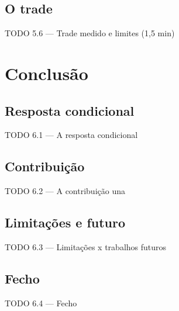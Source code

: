 \documentclass{beamer}
\begin{document}
\subsection{O trade}
\begin{frame}{TODO 5.6 --- Trade medido e limites (1,5 min)}
\end{frame}


\section{Conclusão}

\subsection{Resposta condicional}
\begin{frame}{TODO 6.1 --- A resposta condicional}
\end{frame}

\subsection{Contribuição}
\begin{frame}{TODO 6.2 --- A contribuição una}
\end{frame}

\subsection{Limitações e futuro}
\begin{frame}{TODO 6.3 --- Limitações x trabalhos futuros}
\end{frame}

\subsection{Fecho}
{
\specialframe
\begin{frame}{TODO 6.4 --- Fecho}
\end{frame}
}
\end{document}
